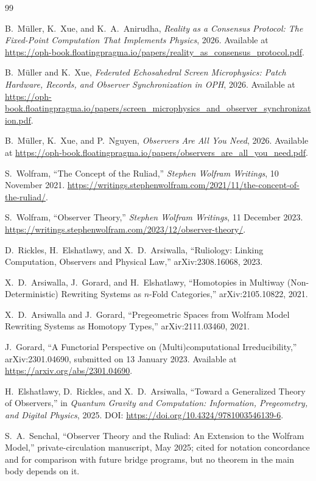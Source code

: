 \documentclass[11pt]{article}
\theoremstyle{remark}
\theoremstyle{plain}
\begin{document}
\begin{thebibliography}{99}

B.~M\"uller, K.~Xue, and K.~A.~Anirudha,
\emph{Reality as a Consensus Protocol: The Fixed-Point Computation That Implements Physics},
2026.
Available at \url{https://oph-book.floatingpragma.io/papers/reality_as_consensus_protocol.pdf}.

B.~M\"uller and K.~Xue,
\emph{Federated Echosahedral Screen Microphysics: Patch Hardware, Records, and Observer Synchronization in OPH},
2026.
Available at \url{https://oph-book.floatingpragma.io/papers/screen_microphysics_and_observer_synchronization.pdf}.

B.~M\"uller, K.~Xue, and P.~Nguyen,
\emph{Observers Are All You Need},
2026.
Available at \url{https://oph-book.floatingpragma.io/papers/observers_are_all_you_need.pdf}.

S.~Wolfram,
``The Concept of the Ruliad,''
\emph{Stephen Wolfram Writings}, 10 November 2021.
\url{https://writings.stephenwolfram.com/2021/11/the-concept-of-the-ruliad/}.

S.~Wolfram,
``Observer Theory,''
\emph{Stephen Wolfram Writings}, 11 December 2023.
\url{https://writings.stephenwolfram.com/2023/12/observer-theory/}.

D.~Rickles, H.~Elshatlawy, and X.~D.~Arsiwalla,
``Ruliology: Linking Computation, Observers and Physical Law,''
arXiv:2308.16068, 2023.

X.~D.~Arsiwalla, J.~Gorard, and H.~Elshatlawy,
``Homotopies in Multiway (Non-Deterministic) Rewriting Systems as \(n\)-Fold Categories,''
arXiv:2105.10822, 2021.

X.~D.~Arsiwalla and J.~Gorard,
``Pregeometric Spaces from Wolfram Model Rewriting Systems as Homotopy Types,''
arXiv:2111.03460, 2021.

J.~Gorard,
``A Functorial Perspective on (Multi)computational Irreducibility,''
arXiv:2301.04690, submitted on 13 January 2023.
Available at \url{https://arxiv.org/abs/2301.04690}.

H.~Elshatlawy, D.~Rickles, and X.~D.~Arsiwalla,
``Toward a Generalized Theory of Observers,''
in \emph{Quantum Gravity and Computation: Information, Pregeometry, and Digital Physics},
2025.
DOI: \url{https://doi.org/10.4324/9781003546139-6}.

S.~A.~Senchal,
``Observer Theory and the Ruliad: An Extension to the Wolfram Model,''
private-circulation manuscript, May 2025; cited for notation concordance and for comparison with future bridge programs, but no theorem in the main body depends on it.

\end{thebibliography}
\end{document}
